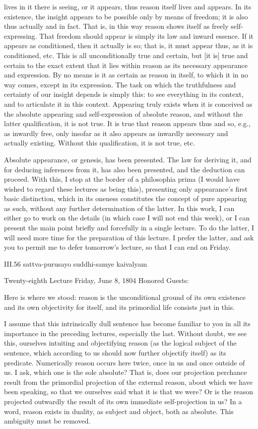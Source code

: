 lives in it there is seeing,
or it appears, thus reason itself lives and appears.
In its existence, the insight appears
to be possible only by means of freedom;
it is also thus actually and in fact.
That is, in this way reason shows itself
as freely self-expressing.
That freedom should appear is
simply its law and inward essence.
If it appears as conditioned, then it actually is so;
that is, it must appear thus, as it is conditioned, etc.
This is all unconditionally true and certain,
but [it is] true and certain to the exact extent
that it lies within reason
as its necessary appearance and expression.
By no means is it as certain as reason in itself,
to which it in no way comes, except in its expression.
The task on which the truthfulness and certainty
of our insight depends is simply this:
to see everything in its context,
and to articulate it in this context.
Appearing truly exists
when it is conceived
as the absolute appearing
and self-expression of absolute reason,
and without the latter qualification,
it is not true.
It is true that reason appears thus and so,
e.g., as inwardly free,
only insofar as it also appears
as inwardly necessary and actually existing.
Without this qualification, it is not true, etc.

Absolute appearance, or genesis,
has been presented.
The law for deriving it,
and for deducing inferences from it,
has also been presented,
and the deduction can proceed.
With this, I stop at the border
of a philosophia prima
(I would have wished to regard
these lectures as being this),
presenting only appearance's
first basic distinction,
which in its oneness constitutes
the concept of pure appearing as such,
without any further determination of the latter.
In this work, I can either go to work on the details
(in which case I will not end this week),
or I can present the main point
briefly and forcefully
in a single lecture.
To do the latter, I will need more time
for the preparation of this lecture.
I prefer the latter, and ask you to
permit me to defer tomorrow's lecture,
so that I can end on Friday.

III.56
sattva-purusayo suddhi-samye kaivalyam

Twenty-eighth Lecture
Friday, June 8, 1804
Honored Guests:

Here is where we stood:
reason is the unconditional ground of its own existence
and its own objectivity for itself,
and its primordial life consists just in this.

I assume that this intrinsically dull sentence has
become familiar to you in all its importance
in the preceding lectures, especially the last.
Without doubt, we see this,
ourselves intuiting and objectifying reason
(as the logical subject of the sentence,
which according to us should now
further objectify itself)
as its predicate.
Numerically reason occurs here twice,
once in us and once outside of us.
I ask, which one is the sole absolute?
That is, does our projection perchance result
from the primordial projection of the external reason,
about which we have been speaking,
so that we ourselves said what it is that we were?
Or is the reason projected outwardly the result
of its own immediate self-projection in us?
In a word, reason exists in duality,
as subject and object,
both as absolute.
This ambiguity must be removed.

